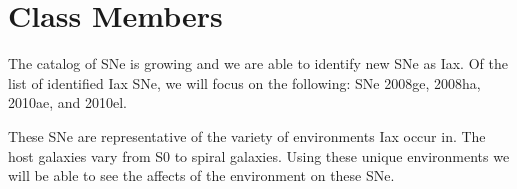 \documentclass[preprint]{aastex}
\begin{document}

\section{Class Members}
The catalog of SNe is growing and we are able to identify new SNe 
as Iax. Of the list of identified Iax SNe, we will focus on the following:  
SNe 2008ge, 2008ha, 2010ae, and 2010el. %

These SNe are representative of the variety of environments Iax
occur in. 
The host galaxies vary from S0 to spiral galaxies. 
Using these unique environments we will be able to 
see the affects of the environment on these SNe. 

\end{document}
